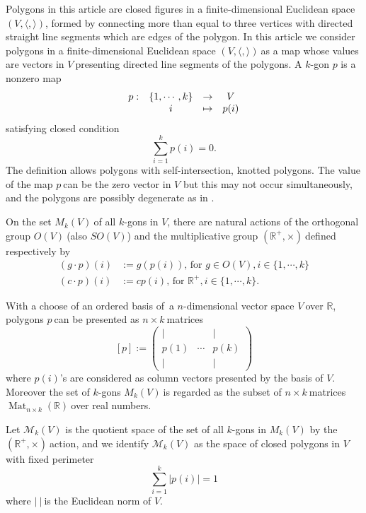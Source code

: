 \documentclass[a4paper]{article}%
\begin{document}
Polygons in this article are closed figures in a finite-dimensional Euclidean
space $(V,\langle,\rangle)$, formed by connecting more than equal to three
vertices with directed straight line segments which are edges of the polygon.
In this article we consider polygons in a finite-dimensional Euclidean space
$(V,\langle,\rangle)\ $as a map whose values are vectors in $V\ $presenting
directed line segments of the polygons. A $k$-gon $p$ is a nonzero map%
\[%
\begin{array}
[c]{cccc}%
p: & \{1,\cdots,k\} & \rightarrow & V\\
& i & \mapsto & p(i)
\end{array}
\]
satisfying closed condition
\[
\sum_{i=1}^{k}p(i)=0.
\]
The definition allows polygons with self-intersection, knotted polygons. The
value of the map $p\ $can be the zero vector in $V$ but this may not occur
simultaneously, and the polygons are possibly degenerate as in \cite{KM2}.

On the set $M_{k}\left(  V\right)  \ $of all $k$-gons in $V$, there are
natural actions of the orthogonal group $O(V)\ $(also $SO(V)$) and the
multiplicative group $(\mathbb{R}^{+},\times)\ $defined respectively by%
\begin{align*}
\left(  g\cdot p\right)  (i)  &  :=g\left(  p(i)\right)  \text{,\ for }g\in
O(V),i\in\{1,\cdots,k\}\\
\left(  c\cdot p\right)  (i)  &  :=cp(i)\text{,\ for }\mathbb{R}^{+}%
,i\in\{1,\cdots,k\}.
\end{align*}


With a choose of an ordered basis of\ a $n$-dimensional vector space $V\ $over
$\mathbb{R}$, polygons $p\ $can be presented as $n\times k\ $matrices\
\[
\left[  p\right]  :=%
\begin{pmatrix}
| &  & |\\
p(1) & \cdots & p\left(  k\right) \\
| &  & |
\end{pmatrix}
\]
where $p\left(  i\right)  $'s are considered as column vectors presented by
the basis of $V$. Moreover the set of $k$-gons $M_{k}\left(  V\right)  \ $is
regarded as the subset of $n\times k\ $matrices $\operatorname{Mat}_{n\times
k}(\mathbb{R})\ $over real numbers.

Let $\mathcal{M}_{k}(V)$ is the quotient space of the set of all $k$-gons in
$M_{k}\left(  V\right)  $ by the $(\mathbb{R}^{+},\times)\ $action, and we
identify $\mathcal{M}_{k}(V)$ as the space of closed polygons in $V$ with
fixed perimeter%
\[
\sum_{i=1}^{k}\left\vert p(i)\right\vert =1
\]
where $\left\vert \ \right\vert \ $is the Euclidean norm of $V$.
\end{document}
